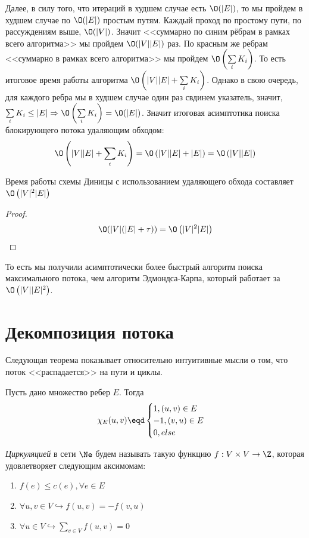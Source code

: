 Далее, в силу того, что итераций в худшем случае есть $\O(|E|)$, то мы пройдем в худшем случае по $\O(|E|)$ простым путям. Каждый проход по простому пути, по рассуждениям выше, $\O(|V|)$. Значит <<суммарно по синим рёбрам в рамках всего алгоритма>> мы пройдем $\O(|V||E|)$ раз.
По красным же ребрам <<суммарно в рамках всего алгоритма>> мы пройдем $\O\left( \sum\limits_{i} K_i \right)$. То есть итоговое время работы алгоритма $\O\left( |V| |E| + \sum\limits_{i} K_i \right)$.
Однако в свою очередь, для каждого ребра мы в худшем случае один раз свдинем указатель, значит, $\sum\limits_{i} K_i \leq |E| \Rightarrow \O\left( \sum\limits_{i} K_i \right) = \O(|E|)$.
Значит итоговая асимптотика поиска блокирующего потока удаляющим обходом:
\begin{equation*}
    \O\left( |V| |E| + \sum\limits_{i} K_i \right) = \O\left( |V| |E| + |E| \right) = \O\left( |V| |E| \right)
\end{equation*}

\Cons Время работы схемы Диницы с использованием удаляющего обхода составляет $\O\left(|V|^2 |E|\right)$
\begin{proof}
    \begin{equation*}
        \O(|V|(|E| + \tau)) = \O\left(|V|^2|E|\right)
    \end{equation*}
\end{proof}

То есть мы получили асимптотически более быстрый алгоритм поиска максимального потока, чем алгоритм Эдмондса-Карпа, который работает за $\O\left( |V||E|^2 \right)$.

\section{Декомпозиция потока}

Следующая теорема показывает относительно интуитивные мысли о том, что поток <<распадается>> на пути и циклы.

\Def Пусть дано множество ребер $E$. Тогда
\begin{equation*}
    \chi_E (u, v) \eqd \begin{cases}
        1, (u, v) \in E \\
        -1, (v, u) \in E \\
        0, else
    \end{cases}
\end{equation*}

\Def \textit{Циркуляцией} в сети $\Ne$ будем называть такую функцию $f: V \times V \to \Z$, которая удовлетворяет следующим аксимомам:
\begin{enumerate}
    \item $f(e) \leq c(e), \forall e \in E$
    \item $\forall u, v \in V \hookrightarrow f(u, v) = -f(v, u)$
    \item $\forall u \in V \hookrightarrow \sum\limits_{v \in V} f(u, v) = 0$
\end{enumerate}

